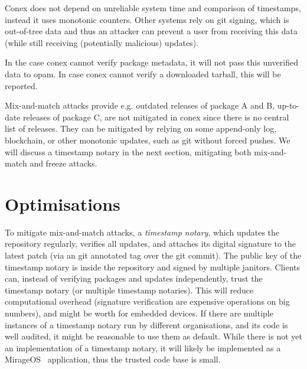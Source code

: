 \documentclass[nocopyrightspace]{sigplanconf}
\newcommand{\TODO}[1]{\textbf{[TODO: #1]}}
\begin{document}
Conex does not depend on unreliable system time and comparison of timestamps, instead it uses monotonic counters.
Other systems rely on git signing, which is out-of-tree data and thus an attacker can prevent a user from receiving this data (while still receiving (potentially malicious) updates).

In the case conex cannot verify package metadata, it will not pass this unverified data to opam.
In case conex cannot verify a downloaded tarball, this will be reported.

Mix-and-match attacks provide e.g. outdated releases of package A and B, up-to-date releases of package C, are not mitigated in conex since there is no central list of releases.
They can be mitigated by relying on some append-only log, blockchain, or other monotonic updates, such as git without forced pushes.
We will discuss a timestamp notary in the next section, mitigating both mix-and-match and freeze attacks.

\section{Optimisations} \label{sec:shortcuts}


To mitigate mix-and-match attacks, a \emph{timestamp notary}, which updates the repository regularly, verifies all updates, and attaches its digital signature to the latest patch (via an git annotated tag over the git commit).
The public key of the timestamp notary is inside the repository and signed by multiple janitors.
Clients can, instead of verifying packages and updates independently, trust the timestamp notary (or multiple timestamp notaries).
This will reduce computational overhead (signature verification are expensive operations on big numbers), and might be worth for embedded devices.
If there are multiple instances of a timestamp notary run by different organisations, and its code is well audited, it might be reasonable to use them as default.
While there is not yet an implementation of a timestamp notary, it will likely be implemented as a MirageOS~\cite{mirage,nqsb-tls} application, thus the trusted code base is small.
\end{document}
